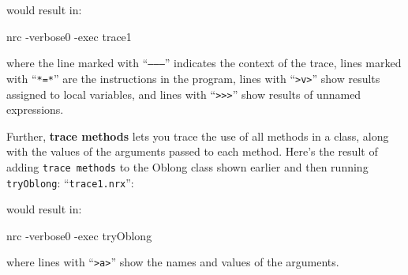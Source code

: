 would result in:

\begin{shaded}
\bash[stderr]
nrc -verbose0 -exec trace1
\END
\end{shaded}


where the line marked with “\texttt{–––}” indicates the context of the trace, lines marked with “\texttt{*=*}” are
the instructions in the program, lines with “\texttt{>v>}” show results assigned to local variables,
and lines with “\texttt{>}\texttt{>}\texttt{>}” show results of unnamed expressions.

Further, \textbf{trace methods} lets you trace the use of all methods in a
class, along with the values of the arguments passed to each
method. Here’s the result of adding \texttt{trace methods} to the Oblong class
shown earlier and then running \texttt{tryOblong}:
“\texttt{trace1.nrx}”:


would result in:

\begin{shaded}
\bash[stderr]
nrc -verbose0 -exec tryOblong
\END
\end{shaded}

where lines with “\texttt{>a>}” show the names and values of the arguments.

